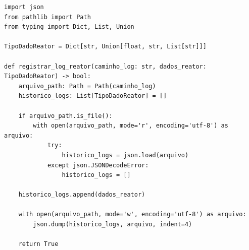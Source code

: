 \ifmostrarGabarito
\begin{verbatim}
import json
from pathlib import Path
from typing import Dict, List, Union

TipoDadoReator = Dict[str, Union[float, str, List[str]]]

def registrar_log_reator(caminho_log: str, dados_reator: TipoDadoReator) -> bool:
    arquivo_path: Path = Path(caminho_log)
    historico_logs: List[TipoDadoReator] = []
    
    if arquivo_path.is_file():
        with open(arquivo_path, mode='r', encoding='utf-8') as arquivo:
            try:
                historico_logs = json.load(arquivo)
            except json.JSONDecodeError:
                historico_logs = []
                
    historico_logs.append(dados_reator)
    
    with open(arquivo_path, mode='w', encoding='utf-8') as arquivo:
        json.dump(historico_logs, arquivo, indent=4)
        
    return True
\end{verbatim}
\fi
